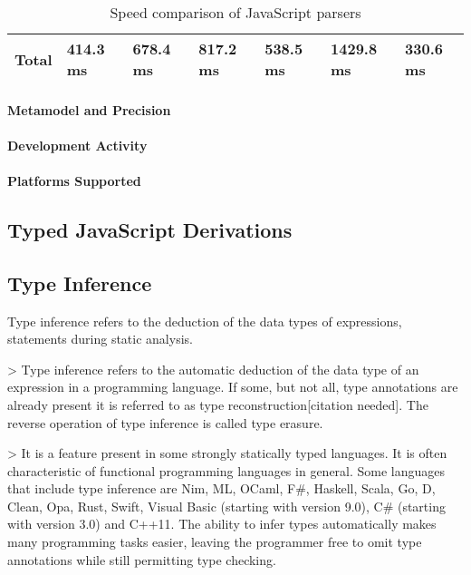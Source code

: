 \begin{table}[!htb]
\begin{tabular}{@{}lllllll@{}}
\textbf{Total}                                                & \textbf{414.3 ms}                                                & \textbf{678.4 ms}                                       & \textbf{817.2 ms}                                       & \textbf{538.5 ms}                                              & \textbf{1429.8 ms}                                      & \textbf{330.6 ms}                                                          \\ \bottomrule
\end{tabular}

\caption{Speed comparison of JavaScript parsers}
\label{table:speed-comparison-of-parsers}
\end{table}

\paragraph{Metamodel and Precision}
\paragraph{Development Activity}
\paragraph{Platforms Supported}

\subsection{Typed JavaScript Derivations}

\subsection{Type Inference}

Type inference refers to the deduction of the data types of expressions, statements during static analysis.

> Type inference refers to the automatic deduction of the data type of an expression in a programming language. If some, but not all, type annotations are already present it is referred to as type reconstruction[citation needed]. The reverse operation of type inference is called type erasure.

> It is a feature present in some strongly statically typed languages. It is often characteristic of functional programming languages in general. Some languages that include type inference are Nim, ML, OCaml, F\#, Haskell, Scala, Go, D, Clean, Opa, Rust, Swift, Visual Basic (starting with version 9.0), C\# (starting with version 3.0) and C++11. The ability to infer types automatically makes many programming tasks easier, leaving the programmer free to omit type annotations while still permitting type checking.

